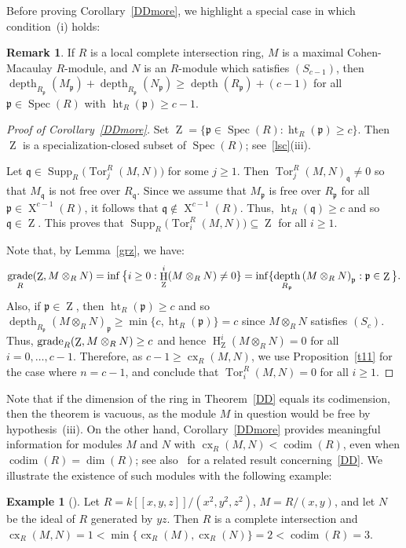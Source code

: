 \documentclass[11pt]{amsart}
\theoremstyle{definition}
\theoremstyle{definition}
\newtheorem{eg}[thm]{Example}
\newtheorem{rmk}[thm]{Remark}
\numberwithin{equation}{section}
\newcommand{\fp}{\mathfrak{p}}
\newcommand{\fq}{\mathfrak{q}}
\DeclareMathOperator{\gr}{\textnormal{grade}}
\DeclareMathOperator{\cx}{cx}
\DeclareMathOperator{\X}{X}
\DeclareMathOperator{\mz}{Z}
\DeclareMathOperator{\depth}{depth}
\DeclareMathOperator{\Ht}{ht}
\DeclareMathOperator{\hh}{H}
\DeclareMathOperator{\Supp}{Supp}
\DeclareMathOperator{\Spec}{Spec}
\DeclareMathOperator{\Tor}{Tor}
\DeclareMathOperator{\cod}{codim}
\begin{document}
Before proving Corollary~\ref{DDmore}, we highlight a special case in which condition~(i) holds:

\begin{rmk} If $R$ is a local complete intersection ring, $M$ is a maximal Cohen-Macaulay $R$-module, and $N$ is an $R$-module which satisfies $(S_{c-1})$, then $\depth_{R_\fp}(M_\fp)+\depth_{R_\fp}(N_\fp)\geq \depth(R_\fp)+(c-1)$ for all $\fp \in \Spec(R)$ with $\Ht_R(\fp)\geq c-1$.
\end{rmk}

\begin{proof}[Proof of Corollary~\ref{DDmore}] Set $\mz=\{\fp \in \Spec(R) : \Ht_R(\fp)\geq c\}$. Then $\mz$ is a specialization-closed subset of $\Spec(R)$; see~\ref{lsc}(iii). 

Let $\fq \in \Supp_R\big(\Tor_j^R(M,N)\big)$ for some $j\geq 1$. Then $\Tor_j^R(M,N)_{\fq}\neq 0$ so that $M_{\fq}$ is not free over $R_{\fq}$. Since we assume that $M_{\fp}$ is free over $R_{\fp}$ for all $\fp \in \X^{c-1}(R)$, it follows that $\fq \notin  \X^{c-1}(R)$. Thus, $\Ht_R(\fq)\geq c$ and so $\fq \in \mz$. This proves that $\Supp_R\big(\Tor_i^R(M,N)\big)\subseteq\mz$ for all $i\geq 1$.

Note that, by Lemma~\ref{grz}, we have:
$$\gr_R(\mz,M\otimes_RN)=\inf\big\{i\geq 0 : \hh_{\mz}^{i}(M\otimes_RN)\neq0\}=\inf\{\depth_{R_{\fp}}\left(M\otimes_RN\right)_{\fp}: \fp\in\mz\big\}.$$ 
Also, if $\fp \in \mz$, then $\Ht_R(\fp)\geq c$ and so $\depth_{R_{\fp}}(M\otimes_RN)_{\fp}\geq \min\{c, \Ht_R(\fp)\}=c$ since $M\otimes_RN$ satisfies $(S_{c})$.
Thus, $\gr_R(\mz,M\otimes_RN)\geq c$ and hence $\hh^i_{\mz}(M\otimes_RN)=0$ for all $i=0, \ldots, c-1$. Therefore, as $c-1\geq  \cx_R(M,N)$, we use Proposition~\ref{t11} for the case where $n=c-1$, and conclude that $\Tor_{i}^R(M,N)=0$ for all $i\geq 1$.
\end{proof}

Note that if the dimension of the ring in Theorem~\ref{DD} equals its codimension, then the theorem is vacuous, as the module $M$ in question would be free by hypothesis~(iii). On the other hand, Corollary~\ref{DDmore} provides meaningful information for modules $M$ and $N$ with $\cx_R(M,N)<\cod(R)$, even when $\cod(R) = \dim(R)$; see also~\cite[3.4]{Ce} for a related result concerning~\ref{DD}. We illustrate the existence of such modules with the following example:

\begin{eg} [{\cite[4.14]{CST}}] \label{excx} Let $R=k[\![x,y,z]\!]/(x^2, y^2, z^2)$, $M=R/(x,y)$, and let $N$ be the ideal of $R$ generated by $yz$. Then $R$ is a complete intersection and $\cx_R(M,N)=1<\min\{\cx_R(M),\cx_R(N)\}=2<\cod(R)=3$. 
\end{eg}
\end{document}
